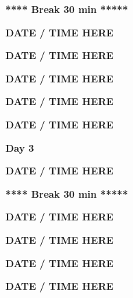 \documentclass[12pt]{extbook}
\newcommand{\dayheader}[1]{
\clearpage
\begin{center}
\Large\bfseries Day #1
\end{center}
\bigskip}
\newcommand{\breaktime}[1]{
\bigskip
\begin{center}
\Large\bfseries ***** Break #1 *****
\end{center}
\bigskip}
\newcommand{\abstract}[2]{{
\bigskip
\begin{center}
\bfseries #1
\end{center}}
\par
}
\begin{document}
\breaktime{30 min}

\abstract{DATE / TIME HERE}{abstracts/Blanc} %
\abstract{DATE / TIME HERE}{abstracts/Brennwald} %
\abstract{DATE / TIME HERE}{abstracts/Ortega} %







\abstract{DATE / TIME HERE}{abstracts/Musy} %
\abstract{DATE / TIME HERE}{abstracts/Zhao} %






\dayheader{3}

\abstract{DATE / TIME HERE}{abstracts/GroegerTrampe} %

\breaktime{30 min}


\abstract{DATE / TIME HERE}{abstracts/vanRooyen} %

\abstract{DATE / TIME HERE}{abstracts/Iwe} %
\abstract{DATE / TIME HERE}{abstracts/Slagter} %

\abstract{DATE / TIME HERE}{abstracts/Marion} %









\end{document}
